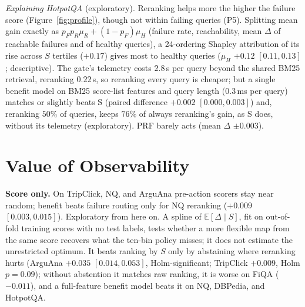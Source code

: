 \documentclass[sigconf,anonymous,review]{acmart}
\begin{document}
\emph{Explaining HotpotQA} (exploratory). Reranking
helps more the higher the failure score (Figure~\ref{fig:profile}),
though not within failing queries (P5). Splitting mean gain exactly as
$p_Fp_R\mu_R+(1-p_F)\mu_H$ (failure rate, reachability, mean $\Delta$
of reachable failures and of healthy queries), a 24-ordering Shapley
attribution of its rise across $S$ tertiles ($+0.17$) gives most to
healthy queries ($\mu_H$ $+0.12$ $[0.11,0.13]$; descriptive). The gate's telemetry costs $2.8$\,s
per query beyond the shared BM25 retrieval, reranking $0.22$\,s, so
reranking every query is cheaper; but a single benefit model on BM25
score-list features and query length ($0.3$\,ms per query) matches or
slightly beats S (paired difference $+0.002$ $[0.000,0.003]$) and,
reranking $50\%$ of queries, keeps $76\%$ of always reranking's gain,
as S does, without its telemetry (exploratory). PRF barely acts (mean $\Delta$ $\pm0.003$).

\section{Value of Observability}
\label{sec:routing}

\textbf{Score only.} On TripClick, NQ, and ArguAna pre-action scorers
stay near random; benefit beats failure routing only for NQ reranking
($+0.009$ $[0.003,0.015]$). Exploratory from here on. A spline of
$\mathbb{E}[\Delta\mid S]$, fit on out-of-fold training scores with no
test labels, tests whether a more flexible map from the same score
recovers what the ten-bin policy misses; it does not estimate the
unrestricted optimum. It beats ranking by $S$ only by abstaining where
reranking hurts (ArguAna $+0.035$ $[0.014,0.053]$, Holm-significant;
TripClick $+0.009$, Holm $p=0.09$); without abstention it matches raw ranking, it is
worse on FiQA ($-0.011$), and a full-feature benefit model beats it on
NQ, DBPedia, and HotpotQA.
\end{document}
